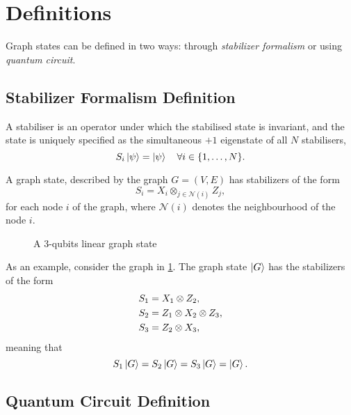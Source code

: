 \section{Definitions}
\label{Sec:graph_definition}

Graph states can be defined in two ways: through \emph{stabilizer formalism} or using \emph{quantum circuit}.

\subsection{Stabilizer Formalism Definition}

A stabiliser is an operator under which the stabilised state is invariant, and the state is uniquely specified as the simultaneous $+1$ eigenstate of all $N$ stabilisers,
\begin{equation}
    S_i \ket{\psi} = \ket{\psi} \quad \forall i \in \{1, \ldots, N\} .
\end{equation}

A graph state, described by the graph $G = (V, E)$ has stabilizers of the form
\begin{equation}
    S_i = X_i \otimes_{j \in \mathcal{N}(i)} Z_j ,
\end{equation}
for each node $i$ of the graph, where $\mathcal{N}(i)$ denotes the neighbourhood of the node $i$.

\begin{figure}
    \centering
    
    \vspace{-1cm}
    \caption{A $3$-qubits linear graph state}
    \label{fig:simple_3_graph}
\end{figure}

As an example, consider the graph in \cref{fig:simple_3_graph}.
The graph state $\ket{G}$ has the stabilizers of the form
\begin{align}
    S_1 &= X_1 \otimes Z_2 , \notag \\
    S_2 &= Z_1 \otimes X_2 \otimes Z_3 , \label{eq:stabilizers} \\
    S_3 &= Z_2 \otimes X_3 , \notag
\end{align}
meaning that
\begin{equation}
    S_1 \ket{G} = 
    S_2 \ket{G} = 
    S_3 \ket{G} = 
    \ket{G} .
\end{equation}

\subsection{Quantum Circuit Definition}

